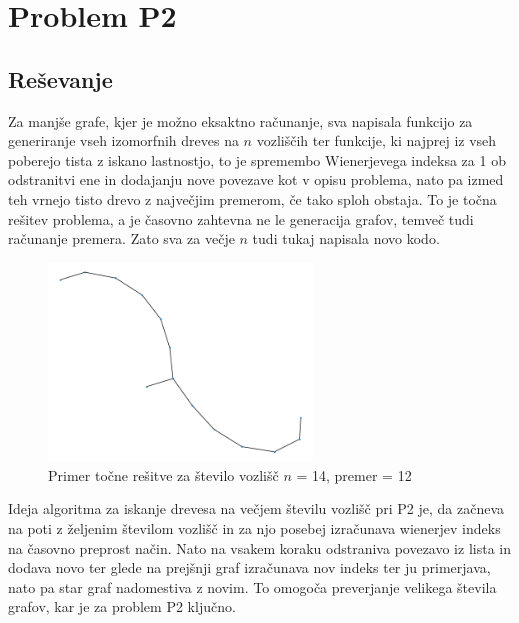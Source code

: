 \documentclass[a4paper, 12 pt]{article}
\begin{document}
\pagebreak

\section{Problem P2}

\subsection{Reševanje}

Za manjše grafe, kjer je možno eksaktno računanje, sva napisala funkcijo za generiranje vseh izomorfnih dreves na $n$ vozliščih ter funkcije, ki najprej iz vseh poberejo tista z iskano lastnostjo, to je spremembo Wienerjevega indeksa za 1 ob odstranitvi ene in dodajanju nove povezave kot v opisu problema, nato pa izmed teh vrnejo tisto drevo z največjim premerom, če tako sploh obstaja. To je točna rešitev problema, a je časovno zahtevna ne le generacija grafov, temveč tudi računanje premera. Zato sva za večje $n$ tudi tukaj napisala novo kodo. \\

\begin{figure}[H]
\centering
  \includegraphics[width=7cm]{drevo14diam12.png}
  \caption{Primer točne rešitve za število vozlišč $n$ = 14, premer = 12}
  \label{fig:graf1}
\end{figure}

Ideja algoritma za iskanje drevesa na večjem številu vozlišč pri P2 je, da začneva na poti z željenim številom vozlišč in za njo posebej izračunava wienerjev indeks na časovno preprost način. Nato na vsakem koraku odstraniva povezavo iz lista in dodava novo ter glede na prejšnji graf izračunava nov indeks ter ju primerjava, nato pa star graf nadomestiva z novim. To omogoča preverjanje velikega števila grafov, kar je za problem P2 ključno.\\
\end{document}

